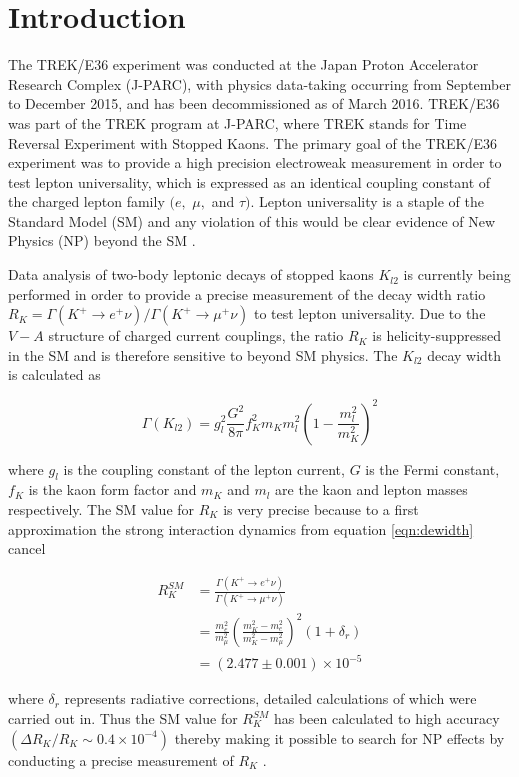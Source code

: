 \chapter{Introduction}
\label{labint}
 The TREK/E36 experiment was conducted at the Japan Proton Accelerator Research Complex (J-PARC), with physics data-taking occurring from September to December 2015, and has been decommissioned as of March 2016. TREK/E36 was part of the TREK program at J-PARC, where TREK stands for Time Reversal Experiment with Stopped Kaons. The primary goal of the TREK/E36 experiment was to provide a high precision electroweak measurement in order to test lepton universality, which is expressed as an identical coupling constant of the charged lepton family $(e,$ $\mu,$ and $\tau)$. Lepton universality is a staple of the Standard Model (SM) and any violation of this would be clear evidence of New Physics (NP) beyond the SM \cite{e06prop}. 
 
 Data analysis of two-body leptonic decays of stopped kaons $K_{l2}$ is currently being performed in order to provide a precise measurement of the decay width ratio $R_K=\Gamma(K^+\rightarrow e^+\nu)/\Gamma(K^+\rightarrow\mu^+\nu)$ to test lepton universality. Due to the $V-A$ structure of charged current couplings, the ratio $R_K$ is helicity-suppressed in the SM and is therefore sensitive to beyond SM physics. The $K_{l2}$ decay width is calculated as
 
 \begin{equation}
  \Gamma(K_{l2})=g^{2}_{l}\frac{G^2}{8\pi}f^{2}_{K}m_Km^{2}_{l}\left(1-\frac{m^{2}_{l}}{m^{2}_{K}}\right)^2
  \label{eqn:dewidth}
 \end{equation}

 \noindent where $g_l$ is the coupling constant of the lepton current, $G$ is the Fermi constant, $f_K$ is the kaon form factor and $m_K$ and $m_l$ are the kaon and lepton masses respectively. The SM value for $R_K$ is very precise because to a first approximation the strong interaction dynamics from equation \ref{eqn:dewidth} cancel
 
 \begin{align}
  R^{SM}_{K}&=\frac{\Gamma(K^+\rightarrow e^+\nu)}{\Gamma(K^+\rightarrow\mu^+\nu)}\nonumber \\
  &=\frac{m^{2}_{e}}{m^{2}_{\mu}}\left(\frac{m^{2}_{K}-m^{2}_{e}}{m^{2}_{K}-m^{2}_{\mu}}\right)^2(1+\delta_r)\nonumber \\
  &=(2.477\pm0.001)\times10^{-5}
  \label{eqn:ratioRk}
 \end{align}

 where $\delta_r$ represents radiative corrections, detailed calculations of which were carried out in. Thus the SM value for $R^{SM}_{K}$ has been calculated to high accuracy $(\Delta R_K/R_K\sim0.4\times10^{-4})$ thereby making it possible to search for NP effects by conducting a precise measurement of $R_K$ \cite{Kohl2013rma}.
